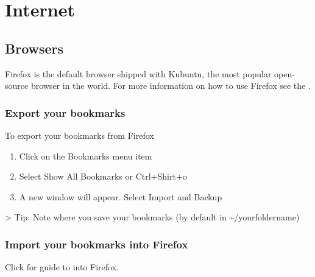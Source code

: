 \documentclass[letterpaper,10pt,english]{sphinxmanual}
\begin{document}
\section{Internet}
\label{\detokenize{docs/software:internet}}

\subsection{Browsers}
\label{\detokenize{docs/software:browsers}}
Firefox is the default browser shipped with Kubuntu, the most popular open-source browser in the world. For more information on how to use Firefox see the .


\subsubsection{Export your bookmarks}
\label{\detokenize{docs/software:export-your-bookmarks}}
To export your bookmarks from Firefox
\begin{enumerate}
\item {} 
Click on the Bookmarks menu item

\item {} 
Select Show All Bookmarks or Ctrl+Shirt+o

\item {} 
A new window will appear. Select Import and Backup

\end{enumerate}

\textgreater{} Tip: Note where you save your bookmarks (by default in \textasciitilde{}/yourfoldername)


\subsubsection{Import your bookmarks into Firefox}
\label{\detokenize{docs/software:import-your-bookmarks-into-firefox}}
Click for guide to  into Firefox.
\end{document}
